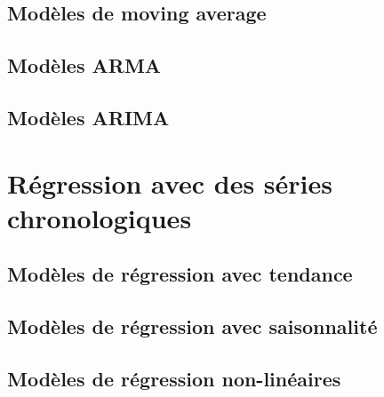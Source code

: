 \documentclass[french]{article}
\begin{document}
\begin{multicols*}{2}
\subsection{Modèles de moving average}


\subsection{Modèles ARMA}


\subsection{Modèles ARIMA}
	


\newpage
\section{Régression avec des séries chronologiques}
\subsection{Modèles de régression avec tendance}


\subsection{Modèles de régression avec saisonnalité}


\subsection{Modèles de régression non-linéaires}



\end{multicols*}
\end{document}
